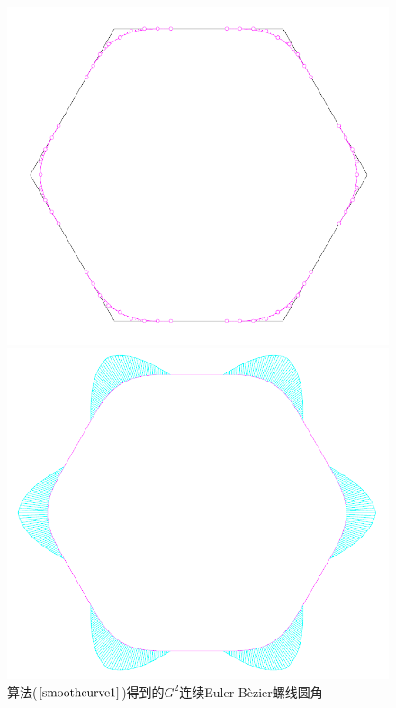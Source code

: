 \documentclass[utf8]{ctexart} %
\numberwithin{figure}{section}
\numberwithin{equation}{section}
\begin{document}
		 \begin{figure}[htbp]
		 	\centering
		 	\begin{minipage}{0.49\linewidth}
		 		\centering
		 		\includegraphics[width=0.9\linewidth]{figures/SmoothCorner1.png}
		 	\end{minipage}
		 	\begin{minipage}{0.49\linewidth}
		 		\centering
		 		\includegraphics[width=0.9\linewidth]{figures/SmoothCorner2.png}
		 	\end{minipage}
	 	
		 	\caption{算法($\ref{smoothcurve1}$)得到的$G^2$连续Euler B\`{e}zier螺线圆角}
		 	\label{EB_figure}
		 \end{figure}
\end{document}
